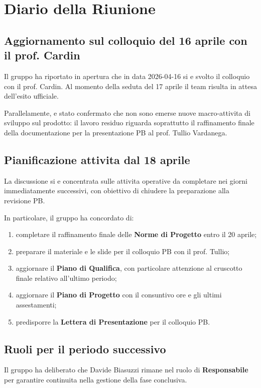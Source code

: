 \documentclass[a4paper, 11pt, oneside]{scrartcl}
\begin{document}
\newpage
\section{Diario della Riunione}

\subsection{Aggiornamento sul colloquio del 16 aprile con il prof. Cardin}
Il gruppo ha riportato in apertura che in data 2026-04-16 si e svolto il colloquio con il prof. Cardin. Al momento della seduta del 17 aprile il team risulta in attesa dell'esito ufficiale.

Parallelamente, e stato confermato che non sono emerse nuove macro-attivita di sviluppo sul prodotto: il lavoro residuo riguarda soprattutto il raffinamento finale della documentazione per la presentazione PB al prof. Tullio Vardanega.

\subsection{Pianificazione attivita dal 18 aprile}
La discussione si e concentrata sulle attivita operative da completare nei giorni immediatamente successivi, con obiettivo di chiudere la preparazione alla revisione PB.

In particolare, il gruppo ha concordato di:
\begin{enumerate}[noitemsep, topsep=3pt]
	\item completare il raffinamento finale delle \textbf{Norme di Progetto} entro il 20 aprile;
	\item preparare il materiale e le slide per il colloquio PB con il prof. Tullio;
	\item aggiornare il \textbf{Piano di Qualifica}, con particolare attenzione al cruscotto finale relativo all'ultimo periodo;
	\item aggiornare il \textbf{Piano di Progetto} con il consuntivo ore e gli ultimi assestamenti;
	\item predisporre la \textbf{Lettera di Presentazione} per il colloquio PB.
\end{enumerate}

\subsection{Ruoli per il periodo successivo}
Il gruppo ha deliberato che Davide Biasuzzi rimane nel ruolo di \textbf{Responsabile} per garantire continuita nella gestione della fase conclusiva.
\end{document}
